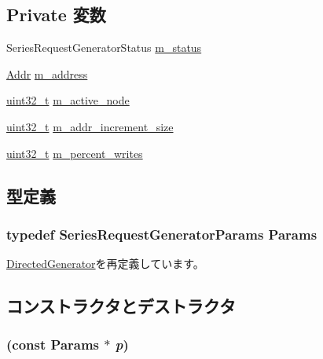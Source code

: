 \subsection*{Private 変数}
\begin{DoxyCompactItemize}
\item 
SeriesRequestGeneratorStatus \hyperlink{classSeriesRequestGenerator_a2ecf6f10d4a6a20990ac439e3d0cab30}{m\_\-status}
\item 
\hyperlink{base_2types_8hh_af1bb03d6a4ee096394a6749f0a169232}{Addr} \hyperlink{classSeriesRequestGenerator_aae7af981b728cf3cdda1dd5cf218711a}{m\_\-address}
\item 
\hyperlink{Type_8hh_a435d1572bf3f880d55459d9805097f62}{uint32\_\-t} \hyperlink{classSeriesRequestGenerator_af238cefef1c08197b9a5b013664e895a}{m\_\-active\_\-node}
\item 
\hyperlink{Type_8hh_a435d1572bf3f880d55459d9805097f62}{uint32\_\-t} \hyperlink{classSeriesRequestGenerator_a5953e604e2b5ee3378b20744144b9fda}{m\_\-addr\_\-increment\_\-size}
\item 
\hyperlink{Type_8hh_a435d1572bf3f880d55459d9805097f62}{uint32\_\-t} \hyperlink{classSeriesRequestGenerator_a4b4ba0e6f69baeee00bc034b2403dab9}{m\_\-percent\_\-writes}
\end{DoxyCompactItemize}


\subsection{型定義}
\hypertarget{classSeriesRequestGenerator_a0f1dfc608e63d6aef0930883cc174b42}{
\subsubsection[{Params}]{\setlength{\rightskip}{0pt plus 5cm}typedef SeriesRequestGeneratorParams {\bf Params}}}
\label{classSeriesRequestGenerator_a0f1dfc608e63d6aef0930883cc174b42}


\hyperlink{classDirectedGenerator_ac723463fca65df4ca9fb4e67caddf417}{DirectedGenerator}を再定義しています。

\subsection{コンストラクタとデストラクタ}
\hypertarget{classSeriesRequestGenerator_a6cd4d5ed278bfcc60352e3bbc8d0d21c}{
\subsubsection[{SeriesRequestGenerator}]{ (const {\bf Params} $\ast$ {\em p})}}
\label{classSeriesRequestGenerator_a6cd4d5ed278bfcc60352e3bbc8d0d21c}



